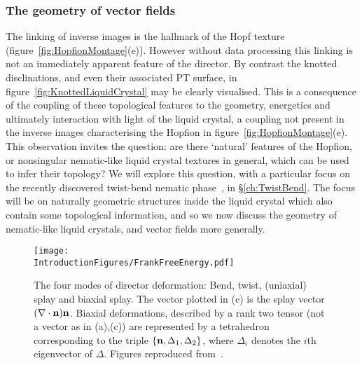 \subsubsection{The geometry of vector fields}
\label{subsec:Geometry}
The linking of inverse images is the hallmark of the Hopf texture (figure~\ref{fig:HopfionMontage}(e)). However without data processing this linking is not an immediately apparent feature of the director. By contrast the knotted disclinations, and even their associated PT surface, in figure~\ref{fig:KnottedLiquidCrystal} may be clearly visualised. This is a consequence of the coupling of these topological features to the geometry, energetics and ultimately interaction with light of the liquid crystal, a coupling not present in the inverse images characterising the Hopfion in figure~\ref{fig:HopfionMontage}(e). This observation invites the question: are there `natural' features of the Hopfion, or nonsingular nematic-like liquid crystal textures in general, which can be used to infer their topology? We will explore this question, with a particular focus on the recently discovered twist-bend nematic phase~\citep{Lavrentovich2018}, in \S\ref{ch:TwistBend}. The focus will be on naturally geometric structures inside the liquid crystal which also contain some topological information, and so we now discuss the geometry of nematic-like liquid crystals, and vector fields more generally. 
\begin{figure}[htbp]
\centering
\texttt{[image: \\IntroductionFigures/FrankFreeEnergy.pdf]}
\caption[Modes of nematic deformation.]{The four modes of director deformation: Bend, twist, (uniaxial) splay and biaxial splay. The vector plotted in (c) is the splay vector $(\nabla \cdot {\bf n}) \bf n$. Biaxial deformations, described by a rank two tensor (not a vector as in (a),(c)) are represented by a tetrahedron corresponding to the triple $\{{\bf n},\Delta_1, \Delta_2\}$, where $\Delta_i$ denotes the $i$th eigenvector of $\Delta$. Figures reproduced from~\citep{Selinger2019}. }
\label{fig:FrankFreeEnergy}
\end{figure}


